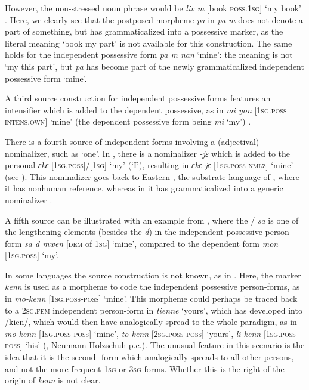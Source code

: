 \documentclass[output=paper]{langsci/langscibook}
\begin{document}
However, the non-stressed noun phrase would be \textit{liv m} [book \textsc{poss.1sg]} ‘my book’ \citep{Fattier2013}. Here, we clearly see that the postposed morpheme \textit{pa} in \textit{pa m} does not denote a part of something, but has grammaticalized into a possessive marker, as the literal meaning ‘book my part’ is not available for this construction. The same holds for the independent possessive form \textit{pa m nan} ‘mine’: the meaning is not ‘my this part’, but \textit{pa} has become part of the newly grammaticalized independent possessive form ‘mine’. 

A third source construction for independent possessive forms features an intensifier which is added to the dependent possessive, as in  \textit{mi yon} [\textsc{1sg.poss} \textsc{intens.own}] ‘mine’ (the dependent possessive form being \textit{mi} ‘my’) \citep{Finney2013}.

There is a fourth source of independent forms involving a  (adjectival) nominalizer, such as ‘one’. In , there is a  nominalizer \textit{{}-jɛ} which is added to the personal  \textit{ɛkɛ} [\textsc{1sg.poss}]/[1\textsc{sg}] ‘my’ (‘I’), resulting in \textit{ɛkɛ-jɛ} [\textsc{1sg.poss-nmlz}] ‘mine’ (see ). This nominalizer goes back to Eastern , the substrate language of , where it has  nonhuman reference, whereas in  it has grammaticalized into a generic nominalizer \citep{Kouwenberg2013}.

A fifth source can be illustrated with an example from , where the  / \textit{sa} is one of the lengthening elements (besides the   \textit{d}) in the independent possessive person-form \textit{sa d mwen} [\textsc{dem} of \textsc{1sg}] ‘mine’, compared to the dependent form \textit{mon} [\textsc{1sg.poss}] ‘my’.

In some  languages the source construction is not known, as in . Here, the marker \textit{kenn} is used as a morpheme to code the independent possessive person-forms, as in \textit{mo-kenn} [\textsc{1sg.poss-poss}] ‘mine’. This morpheme could perhaps be traced back to a \textsc{2sg.fem} independent person-form in  \textit{tienne} ‘yours’, which has developed into /kien/, which would then have analogically spread to the whole paradigm, as in \textit{mo-kenn} [\textsc{1sg.poss-poss}] ‘mine’, \textit{to-kenn} [\textsc{2sg.poss-poss}] ‘yours’, \textit{li-kenn} [\textsc{1sg.poss-poss}] ‘his’ (\citealt{Neumann-HolzschuhKlingler2013}, Neumann-Holzschuh p.c.). The unusual feature in this scenario is the idea that it is the second- form which analogically spreads to all other persons, and not the more frequent \textsc{1sg} or \textsc{3sg} forms. Whether this is the right  of the origin of \textit{kenn} is not clear.
\end{document}
